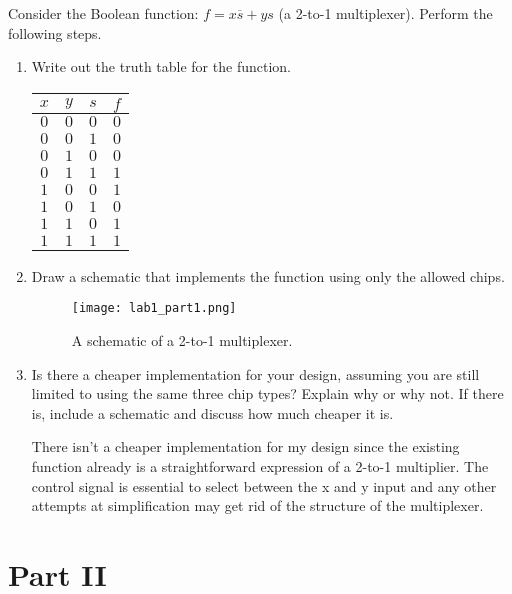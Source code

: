 \documentclass{article}
\begin{document}
Consider the Boolean function: $f = x\overline{s}+ys$ (a 2-to-1 multiplexer).
Perform the following steps.

\begin{enumerate}

\item Write out the truth table for the function.

\begin{center}
\begin{tabular}{ccc|c}
$x$&$y$&$s$&$f$\\
\hline
$0$&$0$&$0$&$0$\\
$0$&$0$&$1$&$0$\\
$0$&$1$&$0$&$0$\\
$0$&$1$&$1$&$1$\\
$1$&$0$&$0$&$1$\\
$1$&$0$&$1$&$0$\\
$1$&$1$&$0$&$1$\\
$1$&$1$&$1$&$1$\\
\end{tabular}
\end{center}

\item Draw a schematic that implements the function using only the allowed chips.

\begin{figure}[!ht]
    \centering
    \texttt{[image: lab1\_part1.png]}
    \caption{A schematic of a 2-to-1 multiplexer.}
    \label{f:part1}
\end{figure}

\item Is there a cheaper implementation for your design, assuming you are still limited to using the same three chip types?
    Explain why or why not.
    If there is, include a schematic and discuss how much cheaper it is.

There isn't a cheaper implementation for my design since the existing function already is a straightforward expression of a 2-to-1 multiplier. The control signal is essential to select between the x and y input and any other attempts at simplification may get rid of the structure of the multiplexer.

\end{enumerate}

\newpage
\section*{Part II}
\end{document}
